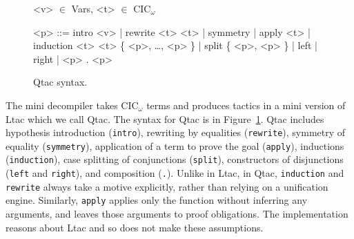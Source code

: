 \begin{figure}
\small
\begin{grammar}
<v> $\in$ Vars, <t> $\in$ CIC$_{\omega}$

<p> ::= intro <v> |  rewrite <t> <t> | symmetry | apply <t> | \\
induction <t> <t> \{ <p>, \ldots, <p> \} | split \{ <p>, <p> \} | left | right | <p> . <p>
\end{grammar}
\vspace{-0.3cm}
\caption{Qtac syntax.}
\label{fig:ltacsyntax1}
\end{figure}

The mini decompiler takes CIC$_{\omega}$ terms and produces tactics in a mini version of Ltac which we call Qtac.
The syntax for Qtac is in Figure~\ref{fig:ltacsyntax1}.
Qtac includes hypothesis introduction (\lstinline{intro}),
rewriting by equalities (\lstinline{rewrite}), symmetry of equality (\lstinline{symmetry}),
application of a term to prove the goal (\lstinline{apply}), inductions (\lstinline{induction}),
case splitting of conjunctions (\lstinline{split}),
constructors of disjunctions (\lstinline{left} and \lstinline{right}), and
composition (\lstinline{.}).
Unlike in Ltac, in Qtac, \lstinline{induction} and \lstinline{rewrite} always take a motive explicitly, rather than relying on a unification engine.
Similarly, \lstinline{apply} applies only the function without inferring any arguments, and leaves those arguments to proof obligations.
The implementation reasons about Ltac and so does not make these assumptions.

